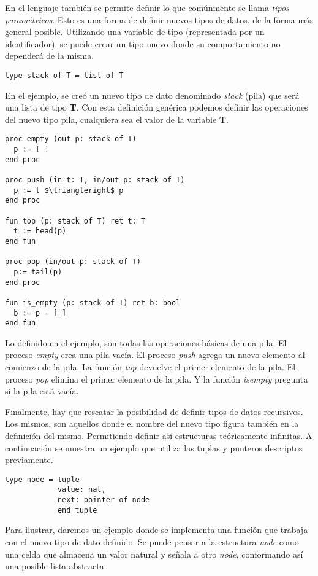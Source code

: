\documentclass{article}
\begin{document}
En el lenguaje también se permite definir lo que comúnmente se llama \textit{tipos paramétricos}.
Esto es una forma de definir nuevos tipos de datos, de la forma más general posible.
Utilizando una variable de tipo (representada por un identificador), se puede crear un tipo nuevo donde su comportamiento no dependerá de la misma.

\begin{lstlisting}
type stack of T = list of T
\end{lstlisting}

En el ejemplo, se creó un nuevo tipo de dato denominado \textit{stack} (pila) que será una lista de tipo \textbf{T}.
Con esta definición genérica podemos definir las operaciones del nuevo tipo pila, cualquiera sea el valor de la variable \textbf{T}.

\begin{lstlisting}
proc empty (out p: stack of T)
  p := [ ]
end proc

proc push (in t: T, in/out p: stack of T)
  p := t $\triangleright$ p
end proc

fun top (p: stack of T) ret t: T
  t := head(p)
end fun

proc pop (in/out p: stack of T)
  p:= tail(p)
end proc

fun is_empty (p: stack of T) ret b: bool
  b := p = [ ]
end fun
\end{lstlisting}

Lo definido en el ejemplo, son todas las operaciones básicas de una pila.
El proceso \textit{empty} crea una pila vacía.
El proceso \textit{push} agrega un nuevo elemento al comienzo de la pila.
La función \textit{top} devuelve el primer elemento de la pila.
El proceso \textit{pop} elimina el primer elemento de la pila.
Y la función \textit{is\gbajo empty} pregunta si la pila está vacía.

Finalmente, hay que rescatar la posibilidad de definir tipos de datos recursivos.
Los mismos, son aquellos donde el nombre del nuevo tipo figura también en la definición del mismo.
Permitiendo definir así estructuras teóricamente infinitas.
A continuación se muestra un ejemplo que utiliza las tuplas y punteros descriptos previamente.

\begin{lstlisting}
type node = tuple
            value: nat,
            next: pointer of node
            end tuple
\end{lstlisting}

Para ilustrar, daremos un ejemplo donde se implementa una función que trabaja con el nuevo tipo de dato definido.
Se puede pensar a la estructura \textit{node} como una celda que almacena un valor natural y señala a otro \textit{node}, conformando así una posible lista abstracta.
\end{document}
